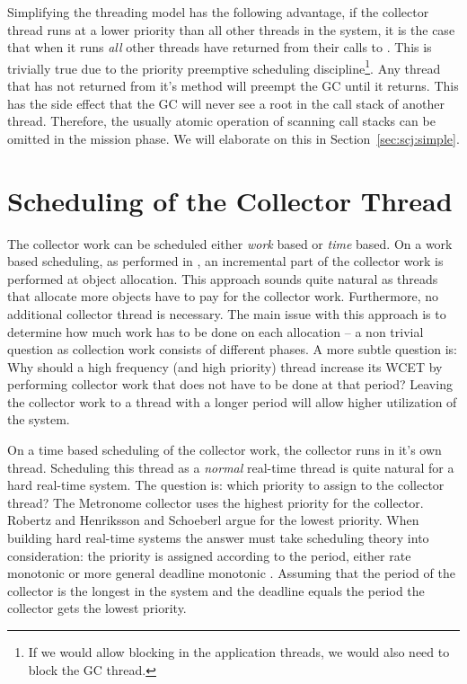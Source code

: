 Simplifying the threading model has the following advantage, if the
collector thread runs at a lower priority than all other threads in
the system, it is the case that when it runs \emph{all} other
threads have returned from their calls to . This is
trivially true due to the priority preemptive scheduling
discipline\footnote{If we would allow blocking in the application
threads, we would also need to block the GC thread.}. Any thread
that has not returned from it's  method will preempt the
GC until it returns. This has the side effect that the GC will never
see a root in the call stack of another thread. Therefore, the
usually atomic operation of scanning call stacks can be omitted in
the mission phase. We will elaborate on this in
Section~\ref{sec:scj:simple}.


\section{Scheduling of the Collector Thread}
\label{sec:gcsched}

The collector work can be scheduled either \emph{work} based or
\emph{time} based. On a work based scheduling, as performed in
\cite{gc:siebert:phd}, an incremental part of the collector work is
performed at object allocation. This approach sounds quite natural
as threads that allocate more objects have to pay for the collector
work. Furthermore, no additional collector thread is necessary. The
main issue with this approach is to determine how much work has to
be done on each allocation -- a non trivial question as collection
work consists of different phases. A more subtle question is: Why
should a high frequency (and high priority) thread increase its WCET
by performing collector work that does not have to be done at that
period? Leaving the collector work to a thread with a longer period
will allow higher utilization of the system.

On a time based scheduling of the collector work, the collector runs
in it's own thread. Scheduling this thread as a \emph{normal}
real-time thread is quite natural for a hard real-time system. The
question is: which priority to assign to the collector thread? The
Metronome collector \cite{gc:bacon03} uses the highest priority for
the collector. Robertz and Henriksson \cite{780745} and Schoeberl
\cite{jop:rtgc_sched} argue for the lowest priority. When building
hard real-time systems the answer must take scheduling theory into
consideration: the priority is assigned according to the period,
either rate monotonic \cite{321743} or more general deadline
monotonic \cite{Audsley-etal91}. Assuming that the period of the
collector is the longest in the system and the deadline equals the
period the collector gets the lowest priority.

